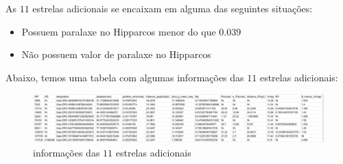 \documentclass{article}
\begin{document}
\begin{enumerate}
	    As $11$ estrelas adicionais se encaixam em alguma das seguintes situações:
		
		\begin{itemize}
			\item Possuem paralaxe no Hipparcos menor do que $0.039$\textquotesingle \textquotesingle
			\item Não possuem valor de paralaxe no Hipparcos
		\end{itemize}
	
		Abaixo, temos uma tabela com algumas informações das $11$ estrelas adicionais:

		\hspace{20pt}		

		\begin{figure}[h]
			\centering
			\includegraphics[width=.98\linewidth]{dados_onze_estrelas.png}
			\caption*{informações das $11$ estrelas adicionais}
		\end{figure}


		
	\end{enumerate}
	
	
\end{document}
